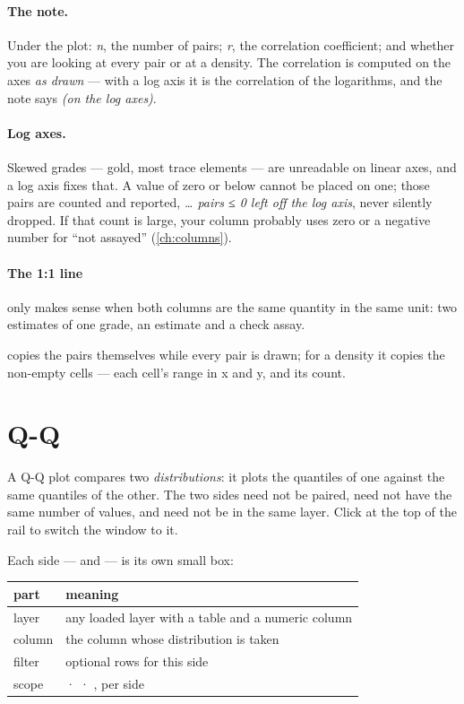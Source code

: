 \paragraph{The note.} Under the plot: \emph{n}, the number of pairs; \emph{r}, the correlation coefficient; and whether you are looking at every pair or at a density. The correlation is computed on the axes \emph{as drawn} — with a log axis it is the correlation of the logarithms, and the note says \emph{(on the log axes)}.

\paragraph{Log axes.} Skewed grades — gold, most trace elements — are unreadable on linear axes, and a log axis fixes that. A value of zero or below cannot be placed on one; those pairs are counted and reported, \emph{… pairs ≤ 0 left off the log axis}, never silently dropped. If that count is large, your column probably uses zero or a negative number for “not assayed” (\cref{ch:columns}).

\paragraph{The 1:1 line} only makes sense when both columns are the same quantity in the same unit: two estimates of one grade, an estimate and a check assay.

 copies the pairs themselves while every pair is drawn; for a density it copies the non-empty cells — each cell's range in x and y, and its count.

\section{Q-Q}\label{sec:stats-qq}
A Q-Q plot compares two \emph{distributions}: it plots the quantiles of one against the same quantiles of the other. The two sides need not be paired, need not have the same number of values, and need not be in the same layer. Click  at the top of the rail to switch the window to it.

Each side —  and  — is its own small box:

\medskip
\begin{tabularx}{\linewidth}{@{}lL@{}}\toprule
part & meaning \\ \midrule
layer & any loaded layer with a table and a numeric column \\
column & the column whose distribution is taken \\
filter & optional rows for this side \\
scope &  ·  · , per side \\ \bottomrule
\end{tabularx}
\medskip

